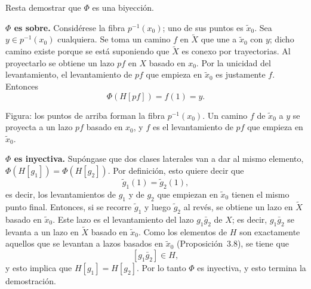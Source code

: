 \documentclass[11pt]{article}
\begin{document}
Resta demostrar que $\Phi$ es una biyección.

\medskip\noindent\textbf{$\Phi$ es sobre.} Considérese la fibra $p^{-1}(x_0)$; uno de sus puntos es $\tilde x_0$. Sea $y\in p^{-1}(x_0)$ cualquiera. Se toma un camino $f$ en $\tilde X$ que une a $\tilde x_0$ con $y$; dicho camino existe porque se está suponiendo que $\tilde X$ es conexo por trayectorias. Al proyectarlo se obtiene un lazo $pf$ en $X$ basado en $x_0$. Por la unicidad del levantamiento, el levantamiento de $pf$ que empieza en $\tilde x_0$ es justamente $f$. Entonces
\[
  \Phi(H[pf])=f(1)=y .
\]

\begin{center}
\end{center}

\noindent Figura: los puntos de arriba forman la fibra $p^{-1}(x_0)$. Un camino $f$ de $\tilde x_0$ a $y$ se proyecta a un lazo $pf$ basado en $x_0$, y $f$ es el levantamiento de $pf$ que empieza en $\tilde x_0$.

\medskip\noindent\textbf{$\Phi$ es inyectiva.} Supóngase que dos clases laterales van a dar al mismo elemento, $\Phi(H[g_1])=\Phi(H[g_2])$. Por definición, esto quiere decir que
\[
  \tilde g_1(1)=\tilde g_2(1),
\]
es decir, los levantamientos de $g_1$ y de $g_2$ que empiezan en $\tilde x_0$ tienen el mismo punto final. Entonces, si se recorre $\tilde g_1$ y luego $\tilde g_2$ al revés, se obtiene un lazo en $\tilde X$ basado en $\tilde x_0$. Este lazo es el levantamiento del lazo $g_1\bar g_2$ de $X$; es decir, $g_1\bar g_2$ se levanta a un lazo en $\tilde X$ basado en $\tilde x_0$. Como los elementos de $H$ son exactamente aquellos que se levantan a lazos basados en $\tilde x_0$ (Proposición~3.8), se tiene que
\[
  [g_1\bar g_2]\in H ,
\]
y esto implica que $H[g_1]=H[g_2]$. Por lo tanto $\Phi$ es inyectiva, y esto termina la demostración.
\end{document}
